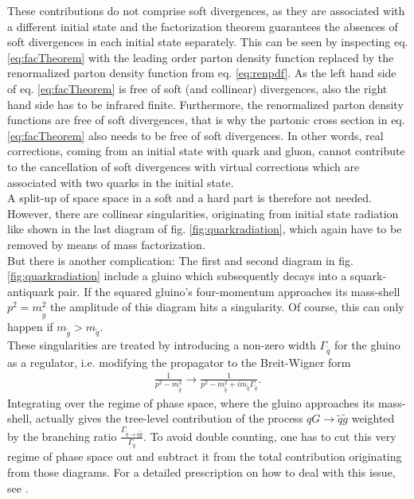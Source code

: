 These contributions do not comprise soft divergences, as they are associated with a different initial state and the factorization theorem guarantees the absences of soft divergences in each initial state separately\cite{dissertori2003quantum}. This can be seen by inspecting eq. \eqref{eq:facTheorem} with the leading order parton density function replaced by the renormalized parton density function from eq. \eqref{eq:renpdf}. As the left hand side of eq. \eqref{eq:facTheorem} is free of soft (and collinear) divergences, also the right hand side has to be infrared finite. Furthermore, the renormalized parton density functions are free of soft divergences, that is why the partonic cross section in eq. \eqref{eq:facTheorem} also needs to be free of soft divergences. In other words, real corrections, coming from an initial state with quark and gluon, cannot contribute to the cancellation of soft divergences with virtual corrections which are associated with two quarks in the initial state.\\
A split-up of space space in a soft and a hard part is therefore not needed. However, there are collinear singularities, originating from initial state radiation like shown in the last diagram of fig. \ref{fig:quarkradiation}, which again have to be removed by means of mass factorization.\\
But there is another complication: The first and second diagram in fig. \ref{fig:quarkradiation} include a gluino which subsequently decays into a squark-antiquark pair. If the squared gluino's four-momentum approaches its mass-shell $p^2 = m^2_{\tilde{g}}$ the amplitude of this diagram hits a singularity. Of course, this can only happen if $m_{\tilde{g}} > m_{\tilde{q}}$.\\
These singularities are treated by introducing a non-zero width $\Gamma_{\tilde{q}}$ for the gluino as a regulator, i.e. modifying the propagator to the Breit-Wigner form
\begin{align}
\frac{1}{p^2 - m_{\tilde{q}}^2} \to \frac{1}{p^2 - m_{\tilde{q}}^2 + i m_{\tilde{q}} \Gamma_{\tilde{q}}}.
\end{align}
Integrating over the regime of phase space, where the gluino approaches its mass-shell, actually gives the tree-level contribution of the process $qG \to \tilde{q}\tilde{g}$ weighted by the branching ratio $\frac{\Gamma_{\tilde{q}\to q \tilde{g}}}{\Gamma_{\tilde{q}}}$. To avoid double counting, one has to cut this very regime of phase space out and subtract it from the total contribution originating from those diagrams. For a detailed prescription on how to deal with this issue, see \cite{Beenakker:1996ch, Gavin:2013kga}.



\newpage